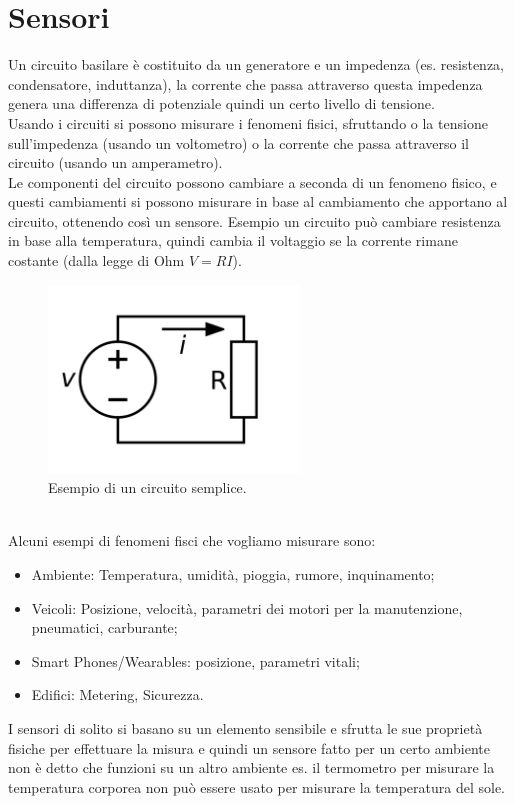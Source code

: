 \documentclass[11pt, twocolumn]{article}
\newenvironment{myitemize}
{ \begin{itemize}[topsep=0ex]
		\setlength{\itemsep}{0pt}
		\setlength{\parskip}{0pt}
		\setlength{\parsep}{0pt}     }
	{ \end{itemize}                  }
\begin{document}
\section{Sensori}
Un circuito basilare è costituito da un generatore e un impedenza (es. resistenza, condensatore, induttanza), la corrente che passa attraverso questa impedenza genera una differenza di potenziale quindi un certo livello di tensione.\\
Usando i circuiti si possono misurare i fenomeni fisici, sfruttando o la tensione sull'impedenza (usando un voltometro) o la corrente che passa attraverso il circuito (usando un amperametro).\\
Le componenti del circuito possono cambiare a seconda di un fenomeno fisico, e questi cambiamenti si possono misurare in base al cambiamento che apportano al circuito, ottenendo così un sensore. Esempio un circuito può cambiare resistenza in base alla temperatura, quindi cambia il voltaggio se la corrente rimane costante (dalla legge di Ohm $V=RI$).\\ 
\begin{figure}[!h]
  \centering
  \includegraphics[width=\linewidth,height=5cm]{imgs/curcuit.png}
  \caption{Esempio di un circuito semplice.}
  \label{fig:circuit}
\end{figure}\\
Alcuni esempi di fenomeni fisci che vogliamo misurare sono:
\begin{myitemize}
  \item Ambiente: Temperatura, umidità, pioggia, rumore, inquinamento;
  \item Veicoli: Posizione, velocità, parametri dei motori per la manutenzione, pneumatici, carburante;
  \item Smart Phones/Wearables: posizione, parametri vitali;
  \item Edifici: Metering, Sicurezza.
\end{myitemize}
I sensori di solito si basano su un elemento sensibile e sfrutta le sue proprietà fisiche per effettuare la misura e quindi un sensore fatto per un certo ambiente non è detto che funzioni su un altro ambiente es. il termometro per misurare la temperatura corporea non può essere usato per misurare la temperatura del sole.\\
\end{document}
